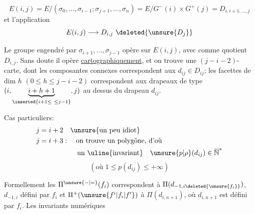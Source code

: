 \[
E(i,j)=E/(\sigma_0,\ldots,\sigma_{i-1};\sigma_{j+1},\ldots,\sigma_n)
=E/G^-(i)\times G^+(j)=D_{i,i+1,\ldots,j}
\]
et l'application
\[
E(i,j)\longrightarrow D_{i,j}\ \deleted{\unsure{D_j}}
\]

Le groupe engendré par $\sigma_{i+1},\ldots,\sigma_{j-1}$ opère sur $E(i,j)$, avec comme quotient $D_{i,j}$. Sans doute il opère \uline{cartographiquement}, et on trouve une $(j-i-2)$-carte, dont les composantes connexes correspondent aux $d_{ij}\in D_{ij}$;  les facettes de dim $h$ $(0\leq h\leq j-i-2)$ correspondent aux drapeaux de type $(i,\underbrace{i+h+1}_{\inserted{i+1\leq\ \leq j-1}},j)$ au dessus du drapeau $d_{ij}$.

Cas particuliers:
\[
\begin{aligned}
j=i+2&\quad\text{\unsure{un peu idiot}}\\
j=i+3&:\quad\text{on trouve un polygône, d'où}\\
&\qquad\text{un \uline{invariant}}\quad\unsure{p|\rho}(d_{ij})\in\overline{\mathbb{N}}^*
\end{aligned}
\]
\[
(\text{où }1\leq p(d_{ij})\leq+\infty)
\]

Formellement les $\Pi^{\unsure{-|=}}(f_i)$ correspondent à  $\Pi(d_{-1,i\deleted{\unsure{f_i}}})$, $d_{-1,i}$ défini par $f_i$   et $\Pi^+(\unsure{f^i|f_i|f'})$  à $\Pi(d_{i,n+1})$, où $d_{i,n+1}$ est défini par $f_i$. Les invariants numériques
